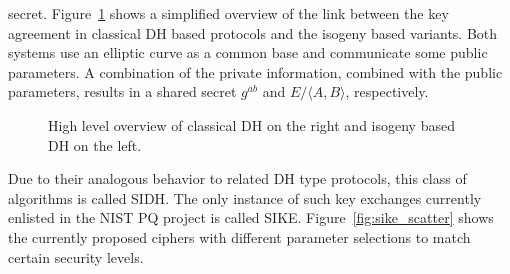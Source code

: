 secret\cite{DBLP:journals/corr/abs-1711-04062}. Figure~\ref{fig:dh_dlog_isogeny} shows a simplified overview of the link between the key agreement in classical DH based protocols and the isogeny based variants. Both systems use an elliptic curve as a common base and communicate some public parameters. A combination of the private information, combined with the public parameters, results in a shared secret \(g^{ab}\) and \( E / \langle A, B \rangle\), respectively.

\begin{figure}[!ht]
    \centering
{}
\caption{High level overview of classical \ac{DH} on the right and isogeny based \ac{DH} on the left\cite{TikZ:for:Cryptographers}.}\label{fig:dh_dlog_isogeny}
\end{figure}

Due to their analogous behavior to related \ac{DH} type protocols, this class of algorithms is called \ac{SIDH}. The only instance of such key exchanges currently enlisted in the \ac{NIST} \ac{PQ} project is called SIKE. Figure~\ref{fig:sike_scatter} shows the currently proposed ciphers with different parameter selections to match certain security levels.


